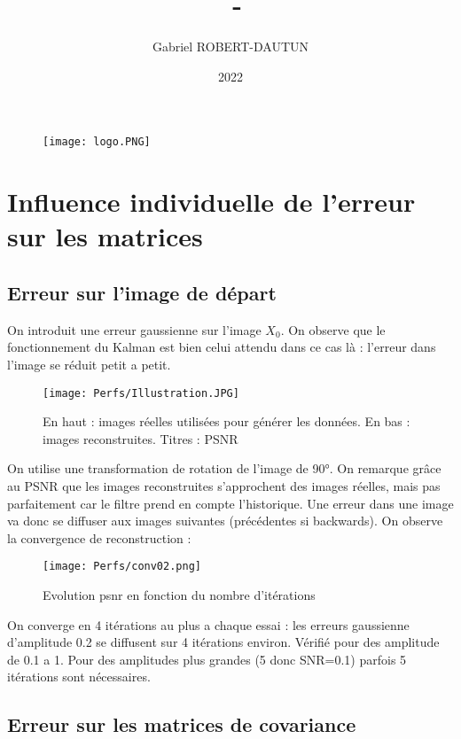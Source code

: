 \documentclass[titlepage]{article}
\author{Gabriel ROBERT-DAUTUN}
\date{2022}
\title{%
	\UE\, - \type\ifthenelse{\nb > 0}{\nb}{} \\
	\large \sbt}
\begin{document}
	
	\begin{figure}
		\centering
		\texttt{[image: logo.PNG]}
		\label{fig:logo}
	\end{figure}
	\maketitle
	
	\newpage
	\tableofcontents
	
	\newpage
	\section{Influence individuelle de l'erreur sur les matrices}
	\subsection{Erreur sur l'image de départ}
	On introduit une erreur gaussienne sur l'image $X_0$. On observe que le fonctionnement du Kalman est bien celui attendu dans ce cas là : l'erreur dans l'image se réduit petit a petit.
	
	\begin{figure}[H]
		\centering
		\texttt{[image: Perfs/Illustration.JPG]}
		\caption{En haut : images réelles utilisées pour générer les données. En bas : images reconstruites. Titres : PSNR}
	\end{figure}

	On utilise une transformation de rotation de l'image de 90°. On remarque grâce au PSNR que les images reconstruites s'approchent des images réelles, mais pas parfaitement car le filtre prend en compte l'historique. Une erreur dans une image va donc se diffuser aux images suivantes (précédentes si backwards). On observe la convergence de reconstruction :
	
	\begin{figure}[H]
		\centering
		\texttt{[image: Perfs/conv02.png]}
		\caption{Evolution psnr en fonction du nombre d'itérations}
	\end{figure}

	On converge en 4 itérations au plus a chaque essai : les erreurs gaussienne d'amplitude 0.2 se diffusent sur 4 itérations environ.
	Vérifié pour des amplitude de 0.1 a 1. Pour des amplitudes plus grandes (5 donc SNR=0.1) parfois 5 itérations sont nécessaires.
	
	\subsection{Erreur sur les matrices de covariance}
	
\end{document}
